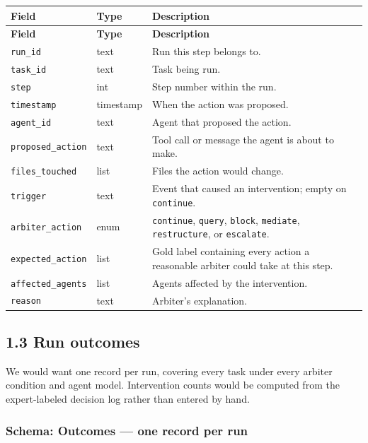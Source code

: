 \documentclass[11pt]{article}
\newcommand{\code}[1]{\texttt{#1}}
\begin{document}
{\small
\begin{longtable}{@{}L{4.8cm}L{1.6cm}L{\dimexpr\linewidth-6.4cm-4\tabcolsep\relax}@{}}
\toprule
\textbf{Field} & \textbf{Type} & \textbf{Description} \\
\midrule
\endfirsthead
\toprule
\textbf{Field} & \textbf{Type} & \textbf{Description} \\
\midrule
\endhead
\bottomrule
\endlastfoot
\code{run\_id} & text & Run this step belongs to. \\
\code{task\_id} & text & Task being run. \\
\code{step} & int & Step number within the run. \\
\code{timestamp} & timestamp & When the action was proposed. \\
\code{agent\_id} & text & Agent that proposed the action. \\
\code{proposed\_action} & text & Tool call or message the agent is about to make. \\
\code{files\_touched} & list & Files the action would change. \\
\code{trigger} & text & Event that caused an intervention; empty on \code{continue}. \\
\code{arbiter\_action} & enum & \code{continue}, \code{query}, \code{block}, \code{mediate}, \code{restructure}, or \code{escalate}. \\
\code{expected\_action} & list & Gold label containing every action a reasonable arbiter could take at this step. \\
\code{affected\_agents} & list & Agents affected by the intervention. \\
\code{reason} & text & Arbiter's explanation. \\
\end{longtable}
}

\subsection*{1.3 Run outcomes}

We would want one record per run, covering every task under every arbiter condition and agent model. Intervention counts would be computed from the expert-labeled decision log rather than entered by hand.

\subsubsection*{Schema: Outcomes --- one record per run}
\end{document}
